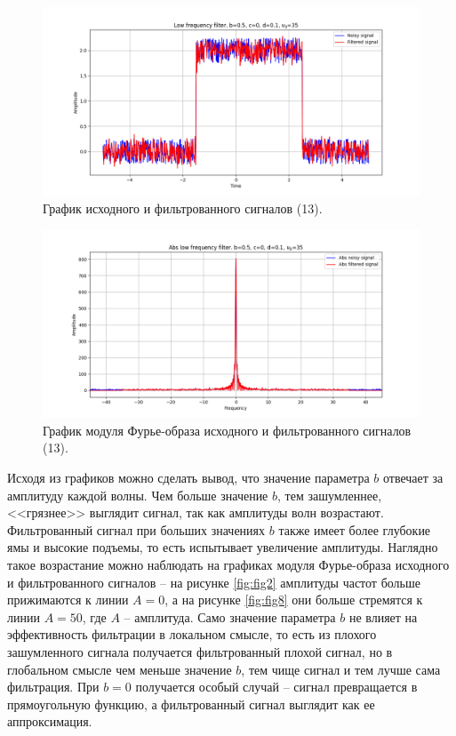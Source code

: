 \documentclass[a4paper, 12pt]{article}
\begin{document}
    \begin{figure}[!htb]
        \centering
        \includegraphics[scale=0.48]{9_u_flt_u_nohigh.png}
        \captionsetup{skip=0pt}
        \caption{График исходного и фильтрованного сигналов (13).}
        \label{fig:fig25}
    \end{figure}
    \begin{figure}[!htb]
        \centering
        \includegraphics[scale=0.48]{9_abs_u_U_nohigh.png}
        \captionsetup{skip=0pt}
        \caption{График модуля Фурье-образа исходного и фильтрованного сигналов (13).}
        \label{fig:fig26}
    \end{figure}


    Исходя из графиков можно сделать вывод, что значение параметра $b$ отвечает за амплитуду каждой волны.
    Чем больше значение $b$, тем зашумленнее, <<грязнее>> выглядит сигнал, так как амплитуды волн возрастают.
    Фильтрованный сигнал при больших значениях $b$ также имеет более глубокие ямы и высокие подъемы, то есть
    испытывает увеличение амплитуды. Наглядно такое возрастание можно наблюдать на графиках модуля Фурье-образа
    исходного и фильтрованного сигналов -- на рисунке \ref{fig:fig2} амплитуды частот больше прижимаются к линии 
    $A=0$, а на рисунке \ref{fig:fig8} они больше стремятся к линии $A=50$, где $A$ -- амплитуда. Само значение
    параметра $b$ не влияет на эффективность фильтрации в локальном смысле, то есть из плохого зашумленного сигнала
    получается фильтрованный плохой сигнал, но в глобальном смысле чем меньше значение $b$, тем чище сигнал и тем лучше
    сама фильтрация. При $b=0$ получается особый случай -- сигнал превращается в прямоугольную функцию, а фильтрованный
    сигнал выглядит как ее аппроксимация.
\end{document}
